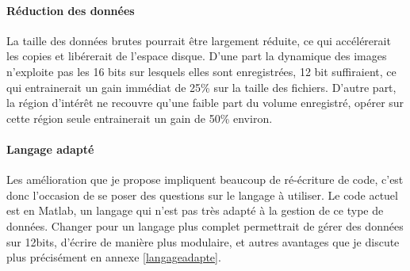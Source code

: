 
\paragraph{Réduction des données}
La taille des données brutes pourrait être largement réduite, ce qui accélérerait les copies et libérerait de l'espace disque. D'une part la dynamique des images n'exploite pas les 16 bits sur lesquels elles sont enregistrées, 12 bit suffiraient, ce qui entrainerait un gain immédiat de 25\% sur la taille des fichiers. D'autre part, la région d'intérêt ne recouvre qu'une faible part du volume enregistré, opérer sur cette région seule entrainerait un gain de 50\% environ.


\paragraph{Langage adapté}
Les amélioration que je propose impliquent beaucoup de ré-écriture de code, c'est donc l'occasion de se poser des questions sur le langage à utiliser. Le code actuel est en Matlab, un langage qui n'est pas très adapté à la gestion de ce type de données. Changer pour un langage plus complet permettrait de gérer des données sur 12bits, d'écrire de manière plus modulaire, et autres avantages que je discute plus précisément en annexe \ref{langageadapte}.


